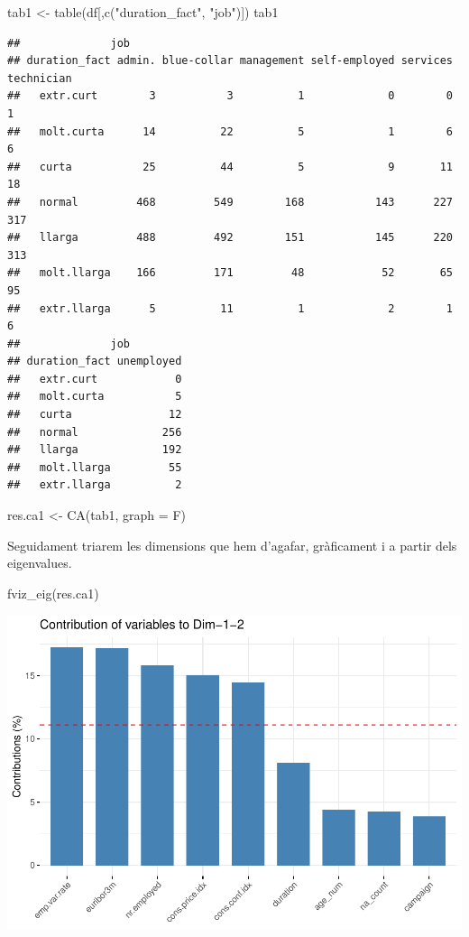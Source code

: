 \documentclass[
]{article}
\newenvironment{Shaded}{\begin{snugshade}}{\end{snugshade}}
\newcommand{\AttributeTok}[1]{\textcolor[rgb]{0.77,0.63,0.00}{#1}}
\newcommand{\FunctionTok}[1]{\textcolor[rgb]{0.00,0.00,0.00}{#1}}
\newcommand{\NormalTok}[1]{#1}
\newcommand{\OtherTok}[1]{\textcolor[rgb]{0.56,0.35,0.01}{#1}}
\newcommand{\StringTok}[1]{\textcolor[rgb]{0.31,0.60,0.02}{#1}}
\begin{document}
\begin{Shaded}
\begin{Highlighting}[]
\NormalTok{tab1 }\OtherTok{\textless{}{-}} \FunctionTok{table}\NormalTok{(df[,}\FunctionTok{c}\NormalTok{(}\StringTok{"duration\_fact"}\NormalTok{, }\StringTok{"job"}\NormalTok{)])}
\NormalTok{tab1}
\end{Highlighting}
\end{Shaded}

\begin{verbatim}
##              job
## duration_fact admin. blue-collar management self-employed services technician
##   extr.curt        3           3          1             0        0          1
##   molt.curta      14          22          5             1        6          6
##   curta           25          44          5             9       11         18
##   normal         468         549        168           143      227        317
##   llarga         488         492        151           145      220        313
##   molt.llarga    166         171         48            52       65         95
##   extr.llarga      5          11          1             2        1          6
##              job
## duration_fact unemployed
##   extr.curt            0
##   molt.curta           5
##   curta               12
##   normal             256
##   llarga             192
##   molt.llarga         55
##   extr.llarga          2
\end{verbatim}

\begin{Shaded}
\begin{Highlighting}[]
\NormalTok{res.ca1 }\OtherTok{\textless{}{-}} \FunctionTok{CA}\NormalTok{(tab1, }\AttributeTok{graph =}\NormalTok{ F)}
\end{Highlighting}
\end{Shaded}

Seguidament triarem les dimensions que hem d'agafar, gràficament i a
partir dels eigenvalues.

\begin{Shaded}
\begin{Highlighting}[]
\FunctionTok{fviz\_eig}\NormalTok{(res.ca1)}
\end{Highlighting}
\end{Shaded}

\includegraphics{Entrega2_files/figure-latex/unnamed-chunk-4-1.pdf}
\end{document}
